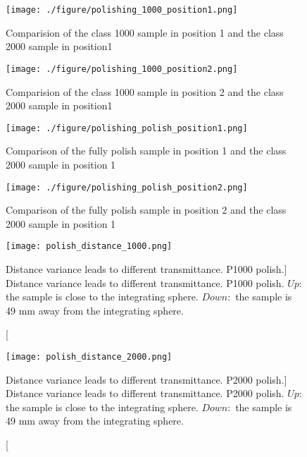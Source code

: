 \begin{figure}
    \centering
    \texttt{[image: ./figure/polishing\_1000\_position1.png]}
    \caption{Comparision of the class 1000 sample in position 1 and the class 2000 sample in position1}
    \label{fig:polishing_1000_position1}
    \end{figure}


\begin{figure}
    \centering
    \texttt{[image: ./figure/polishing\_1000\_position2.png]}
    \caption{Comparision of the class 1000 sample in position 2 and the class 2000 sample in position1}
    \label{fig:polishing_1000_position2}
    \end{figure}

\begin{figure}
    \centering
    \texttt{[image: ./figure/polishing\_polish\_position1.png]}
    \caption{Comparison of the fully polish sample in position 1 and the class 2000 sample in position 1}
    \label{fig:polishing_polish_position1}
    \end{figure}

\begin{figure}
    \centering
    \texttt{[image: ./figure/polishing\_polish\_position2.png]}
    \caption{Comparison of the fully polish sample in position 2 and the class 2000 sample in position 1}
    \label{fig:polishing_polish_position2}
    \end{figure}


\begin{figure}
    \label{fig:polish_distance_1000}
    \centering
    \texttt{[image: polish\_distance\_1000.png]}
    \caption
    [Distance variance leads to different transmittance. P1000 polish.]
    {Distance variance leads to different transmittance. P1000 polish.
$Up:$ the sample is close to the integrating sphere.
$Down:$ the sample is 49 mm away from the integrating sphere.
}
    \end{figure}


\begin{figure}
    \label{fig:fig:polish_distance_2000}
    \centering
    \texttt{[image: polish\_distance\_2000.png]}
    \caption
    [Distance variance leads to different transmittance. P2000 polish.]
    {Distance variance leads to different transmittance. P2000 polish.
$Up:$ the sample is close to the integrating sphere.
$Down:$ the sample is 49 mm away from the integrating sphere.
}
    \end{figure}


